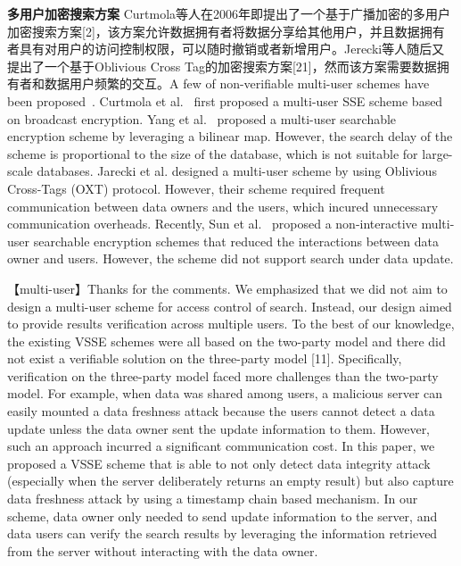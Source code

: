 \noindent\textbf{多用户加密搜索方案} 	Curtmola等人在2006年即提出了一个基于广播加密的多用户加密搜索方案[2]，该方案允许数据拥有者将数据分享给其他用户，并且数据拥有者具有对用户的访问控制权限，可以随时撤销或者新增用户。Jerecki等人随后又提出了一个基于Oblivious Cross Tag的加密搜索方案[21]，然而该方案需要数据拥有者和数据用户频繁的交互。A few of non-verifiable multi-user schemes have been proposed~\cite{curtmola2011searchable,yang2009multiuser,jarecki2013outsourced,sun2016efficient}. Curtmola et al.~\cite{curtmola2011searchable} first proposed a multi-user SSE scheme based on broadcast encryption. Yang et al.~\cite{yang2009multiuser} proposed a multi-user searchable encryption scheme by leveraging a bilinear map. However, the search delay of the scheme is proportional to the size of the database, which is not suitable for large-scale databases.
Jarecki et al. \cite{jarecki2013outsourced} designed a multi-user scheme by using Oblivious Cross-Tags (OXT) protocol. However, their scheme required frequent communication between data owners and the users, which incured unnecessary communication overheads. Recently, Sun et al.~\cite{sun2016efficient} proposed a non-interactive multi-user searchable encryption schemes that reduced the interactions between data owner and users. However, the scheme did not support search under data update.

	【multi-user】Thanks for the comments. We emphasized that we did not aim to design a multi-user scheme for access control of search. Instead, our design aimed to provide results verification across multiple users. To the best of our knowledge, the existing VSSE schemes were all based on the two-party model and there did not exist a verifiable solution on the three-party model [11]. Specifically, verification on the three-party model faced more challenges than the two-party model. For example, when data was shared among users, a malicious server can easily mounted a data freshness attack because the users cannot detect a data update unless the data owner sent the update information to them. However, such an approach incurred a significant communication cost. In this paper, we proposed a VSSE scheme that is able to not only detect data integrity attack (especially when the server deliberately returns an empty result) but also capture data freshness attack by using a timestamp chain based mechanism. In our scheme, data owner only needed to send update information to the server, and data users can verify the search results by leveraging the information retrieved from the server without interacting with the data owner.


